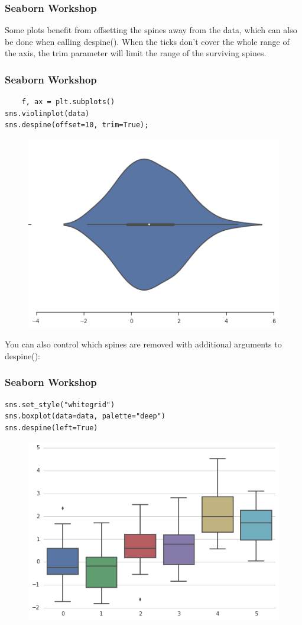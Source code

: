 \documentclass{beamer}
\begin{document}
\begin{frame}[fragile]
	\frametitle{Seaborn Workshop}
	\large Some plots benefit from offsetting the spines away from the data, which can also be done when calling despine(). When the ticks don’t cover the whole range of the axis, the trim parameter will limit the range of the surviving spines.

\end{frame}
\begin{frame}[fragile]
	\frametitle{Seaborn Workshop}
	\large
	\begin{verbatim}
	f, ax = plt.subplots()
sns.violinplot(data)
sns.despine(offset=10, trim=True);
\end{verbatim}
\begin{figure}
\centering
\includegraphics[width=0.7\linewidth]{images/aesthetics_23_0}
\caption{}
\label{fig:aesthetics_23_0}
\end{figure}

You can also control which spines are removed with additional arguments to despine():
\end{frame}
\begin{frame}[fragile]
	\frametitle{Seaborn Workshop}
	\large
\begin{verbatim}
sns.set_style("whitegrid")
sns.boxplot(data=data, palette="deep")
sns.despine(left=True)
\end{verbatim}

\begin{figure}
\centering
\includegraphics[width=0.7\linewidth]{images/aesthetics_25_0}
\caption{}
\label{fig:aesthetics_25_0}
\end{figure}


\end{frame}
\end{document}

